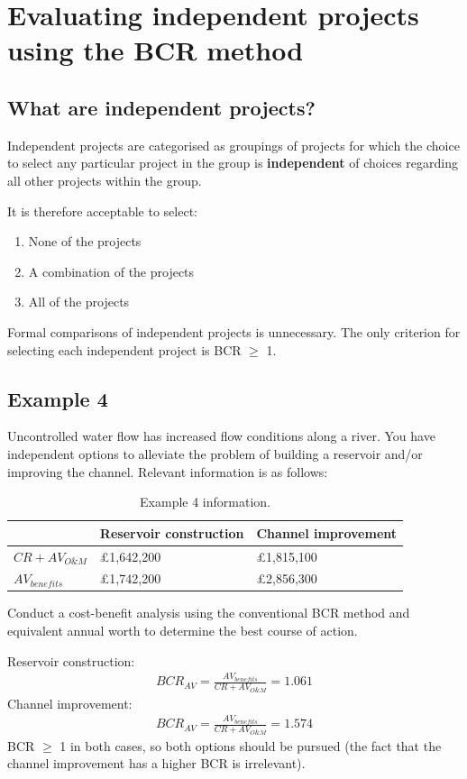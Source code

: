\section{Evaluating independent projects using the BCR method}
\subsection{What are independent projects?}
Independent projects are categorised as groupings of projects for which the choice to select any particular project in the group is \textbf{independent} of choices regarding all other projects within the group.

It is therefore acceptable to select:
\begin{enumerate}
  \item None of the projects
  \item A combination of the projects
  \item All of the projects
\end{enumerate}
Formal comparisons of independent projects is unnecessary. The only criterion for selecting each independent project is BCR $\geq$ 1.
\subsection{Example 4}
Uncontrolled water flow has increased flow conditions along a river. You have independent options to alleviate the problem of building a reservoir and/or improving the channel. Relevant information is as follows:
\begin{table}[H]
  \centering
  \begin{tabular}{@{}lll@{}}
    \toprule
                     & Reservoir construction & Channel improvement \\
    \midrule
    $CR + AV_{O\&M}$ & \pounds 1,642,200      & \pounds 1,815,100   \\
    $AV_{benefits}$  & \pounds 1,742,200      & \pounds 2,856,300   \\
    \bottomrule
  \end{tabular}
  \caption{Example 4 information.}
\end{table}
Conduct a cost-benefit analysis using the conventional BCR method and equivalent annual worth to determine the best course of action.

Reservoir construction:
\begin{gather}
  BCR_{AV} = \frac{AV_{benefits}}{CR + AV_{O\&M}} = 1.061
\end{gather}
Channel improvement:
\begin{gather}
  BCR_{AV} = \frac{AV_{benefits}}{CR + AV_{O\&M}} = 1.574
\end{gather}
BCR $\geq$ 1 in both cases, so both options should be pursued (the fact that the channel improvement has a higher BCR is irrelevant).
